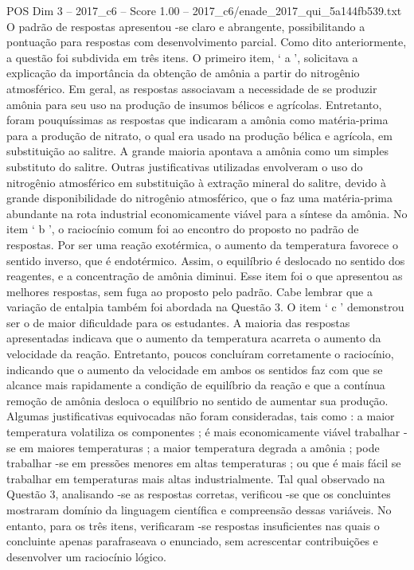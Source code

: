 \begin{textsample}{POS Dim 3 – 2017\_c6 – Score 1.00 – 2017\_c6/enade\_2017\_qui\_5a144fb539.txt}
O padrão de respostas apresentou -se claro e abrangente, possibilitando a pontuação para respostas com desenvolvimento parcial.
Como dito anteriormente, a questão foi subdivida em três itens.
O primeiro item, ‘ a ’, solicitava a explicação da importância da obtenção de amônia a partir do nitrogênio atmosférico.
Em geral, as respostas associavam a necessidade de se produzir amônia para seu uso na produção de insumos bélicos e agrícolas.
Entretanto, foram pouquíssimas as respostas que indicaram a amônia como matéria-prima para a produção de nitrato, o qual era usado na produção bélica e agrícola, em substituição ao salitre.
A grande maioria apontava a amônia como um simples substituto do salitre.
Outras justificativas utilizadas envolveram o uso do nitrogênio atmosférico em substituição à extração mineral do salitre, devido à grande disponibilidade do nitrogênio atmosférico, que o faz uma matéria-prima abundante na rota industrial economicamente viável para a síntese da amônia.
No item ‘ b ’, o raciocínio comum foi ao encontro do proposto no padrão de respostas.
Por ser uma reação exotérmica, o aumento da temperatura favorece o sentido inverso, que é endotérmico.
Assim, o equilíbrio é deslocado no sentido dos reagentes, e a concentração de amônia diminui.
Esse item foi o que apresentou as melhores respostas, sem fuga ao proposto pelo padrão.
Cabe lembrar que a variação de entalpia também foi abordada na Questão 3.
O item ‘ c ’ demonstrou ser o de maior dificuldade para os estudantes.
A maioria das respostas apresentadas indicava que o aumento da temperatura acarreta o aumento da velocidade da reação.
Entretanto, poucos concluíram corretamente o raciocínio, indicando que o aumento da velocidade em ambos os sentidos faz com que se alcance mais rapidamente a condição de equilíbrio da reação e que a contínua remoção de amônia desloca o equilíbrio no sentido de aumentar sua produção.
Algumas justificativas equivocadas não foram consideradas, tais como : a maior temperatura volatiliza os componentes ; é mais economicamente viável trabalhar -se em maiores temperaturas ; a maior temperatura degrada a amônia ; pode trabalhar -se em pressões menores em altas temperaturas ; ou que é mais fácil se trabalhar em temperaturas mais altas industrialmente.
Tal qual observado na Questão 3, analisando -se as respostas corretas, verificou -se que os concluintes mostraram domínio da linguagem científica e compreensão dessas variáveis.
No entanto, para os três itens, verificaram -se respostas insuficientes nas quais o concluinte apenas parafraseava o enunciado, sem acrescentar contribuições e desenvolver um raciocínio lógico.

\end{textsample}
